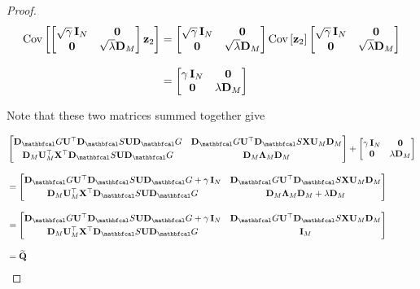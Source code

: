 \begin{proof}
\begin{align*}
    \text{Cov}\left[\begin{bmatrix}
        \sqrt{\gamma} \, \mathbf{I}_N & \mathbf{0} \\
        \mathbf{0} & \sqrt{\lambda} \mathbf{D}_M
    \end{bmatrix} \mathbf{z}_2  \right] &= \begin{bmatrix}
        \sqrt{\gamma} \, \mathbf{I}_N & \mathbf{0} \\
        \mathbf{0} & \sqrt{\lambda} \mathbf{D}_M
    \end{bmatrix}  \text{Cov}\left[ \mathbf{z}_2 \right] \begin{bmatrix}
        \sqrt{\gamma} \, \mathbf{I}_N & \mathbf{0} \\
        \mathbf{0} & \sqrt{\lambda} \mathbf{D}_M
    \end{bmatrix} \\[0.3cm]
    &= \begin{bmatrix}
        \gamma\, \mathbf{I}_N & \mathbf{0} \\
        \mathbf{0} & \lambda \mathbf{D}_M
    \end{bmatrix}
\end{align*}

Note that these two matrices summed together give 

\begin{align*}
    & \begin{bmatrix}
        \D_\Gt \U^\top \D_\St \U \D_\Gt  &  \D_\Gt \U^\top \D_\St \X \U_M \D_M \\[0.1cm] 
        \D_M \U_M^\top \X^\top \D_\St \U \D_\Gt & \D_M \LAM_M \D_M 
        \end{bmatrix} + \begin{bmatrix}
            \gamma\, \I_N & \zero \\
            \zero & \lambda \D_M
        \end{bmatrix} \\[0.3cm]
        &= \begin{bmatrix}
            \D_\Gt \U^\top \D_\St \U \D_\Gt  + \gamma\, \I_N &  \D_\Gt \U^\top \D_\St \X \U_M \D_M \\[0.1cm] 
            \D_M \U_M^\top \X^\top \D_\St \U \D_\Gt & \D_M \LAM_M \D_M + \lambda \D_M
            \end{bmatrix} \\[0.3cm]
        &= \begin{bmatrix}
            \D_\Gt \U^\top \D_\St \U \D_\Gt  + \gamma\, \I_N &  \D_\Gt \U^\top \D_\St \X \U_M \D_M \\[0.1cm] 
            \D_M \U_M^\top \X^\top \D_\St \U \D_\Gt & \I_M
            \end{bmatrix} \\[0.3cm]
        &= \widetilde{\Q}
\end{align*}


\end{proof}
